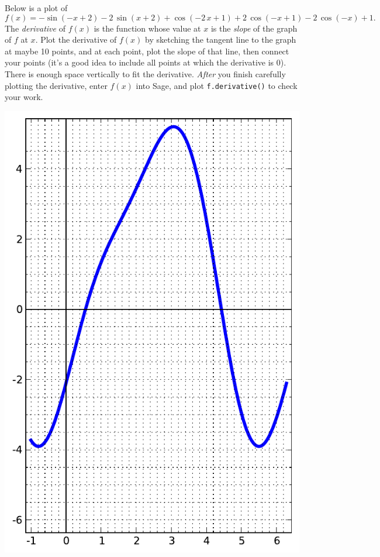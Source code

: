 Below is a plot of $$f(x)=-\sin\left(-x + 2\right) - 2 \, \sin\left(x + 2\right) + \cos\left(-2 \, x + 1\right) + 2 \, \cos\left(-x + 1\right) - 2 \, \cos\left(-x\right) + 1.$$  The {\em \color{red}derivative} of $f(x)$ is the function whose value at $x$ is the {\em slope} of the graph of $f$ at $x$.  Plot the derivative of $f(x)$ by sketching the tangent line to the graph at maybe 10 points, and at each point, plot the slope of that line, then connect your points (it's a good idea to include all points at which the derivative is 0).  There is enough space vertically to fit the derivative.  {\em After} you finish carefully plotting the derivative, enter $f(x)$ into Sage, and plot {\color{blue}\verb|f.derivative()|} to check your work.
\begin{center}\includegraphics{functions/77.pdf}\end{center}\newpage

